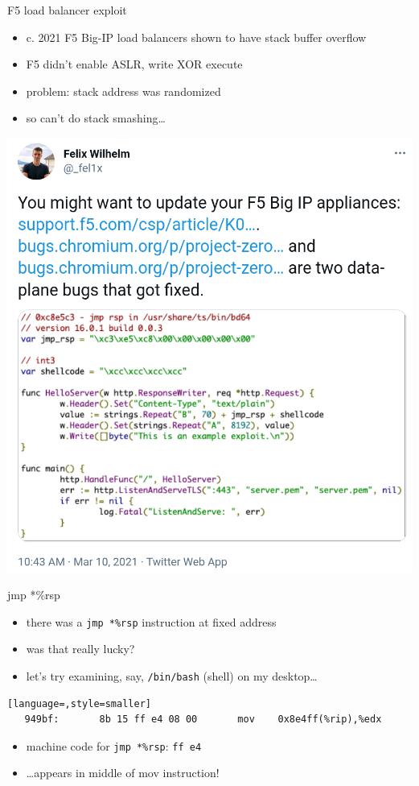 \begin{frame}{F5 load balancer exploit}
\begin{itemize}
\item c. 2021 F5 Big-IP load balancers shown to have stack buffer overflow
\item F5 didn't enable ASLR, write XOR execute
\item problem: stack address was randomized
\item so can't do stack smashing\ldots
\end{itemize}
\end{frame}

\begin{frame}[plain]{}
\includegraphics[height=0.95\textheight]{../rop/f5-poc-twitter}
\end{frame}

\begin{frame}[fragile,label=jmpRsp]{jmp *\%rsp}
    \begin{itemize}
    \item there was a \texttt{jmp *\%rsp} instruction at fixed address
    \vspace{.5cm}
    \item was that really lucky?
    \item let's try examining, say, \texttt{/bin/bash} (shell) on my desktop\ldots
    \end{itemize}
\begin{lstlisting}[language=,style=smaller]
   949bf:       8b 15 ff e4 08 00       mov    0x8e4ff(%rip),%edx
\end{lstlisting}
    \begin{itemize}
        \item machine code for \texttt{jmp *\%rsp}: \texttt{ff e4}
        \item \ldots appears in middle of mov instruction!
    \end{itemize}
\end{frame}


